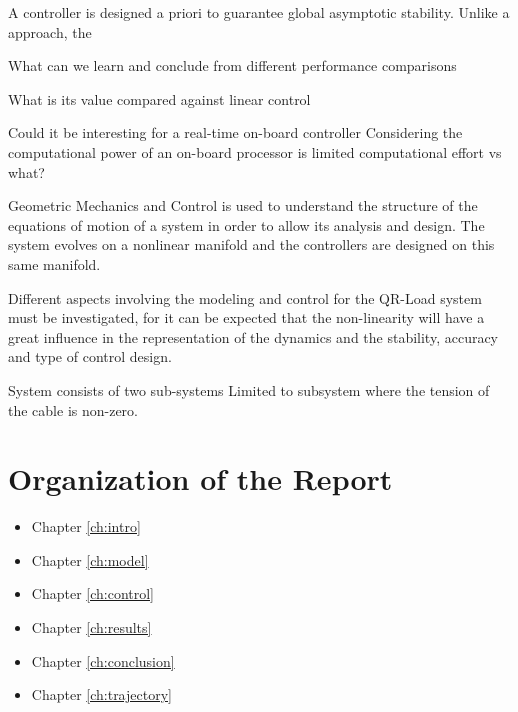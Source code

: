 A controller is designed a priori to guarantee global asymptotic stability. 
Unlike a  approach, the 

What can we learn and conclude from different performance comparisons

What is its value compared against linear control

Could it be interesting for a real-time on-board controller
Considering the computational power of an on-board processor is limited
computational effort vs what?

Geometric Mechanics and Control is used to understand the structure of the equations of motion of a system in order to allow its analysis and design. The system evolves on a nonlinear manifold and the controllers are designed on this same manifold.

Different aspects involving the modeling and control for the QR-Load system must be investigated, for it can be expected that the non-linearity will have a great influence in the representation of the dynamics and the stability, accuracy and type of control design.

System consists of two sub-systems
Limited to subsystem where the tension of the cable is non-zero. 

\section{Organization of the Report}

\begin{itemize}
\item Chapter \ref{ch:intro}
\item Chapter \ref{ch:model}
\item Chapter \ref{ch:control}
\item Chapter \ref{ch:results}
\item Chapter \ref{ch:conclusion}
\item Chapter \ref{ch:trajectory}
\end{itemize}
